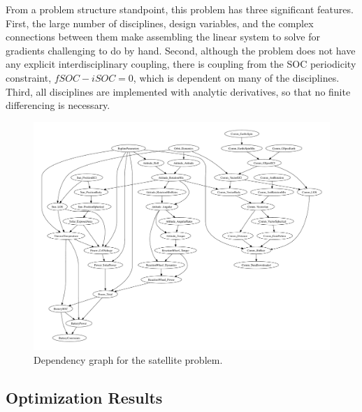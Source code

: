 \documentclass[]{aiaa-tc} %
\begin{document}
    From a problem structure standpoint, this problem has three significant features. First, the large number of
    disciplines, design variables, and the complex connections between them make assembling the linear system to solve for gradients
    challenging to do by hand. Second, although the problem does not have any explicit interdisciplinary coupling,
    there is coupling from the SOC periodicity constraint, $fSOC - iSOC = 0$, which is dependent on many of the
    disciplines. Third, all disciplines are implemented with analytic derivatives, so that no finite differencing is necessary.

    \begin{figure}[!htb]\begin{center}
      \includegraphics[width=.95\textwidth]{images/CADRE.pdf}
      \caption{ Dependency graph for the satellite problem. \label{fig:cadre_graph}}
    \end{center}\end{figure}

    \subsection{Optimization Results}
\end{document}

